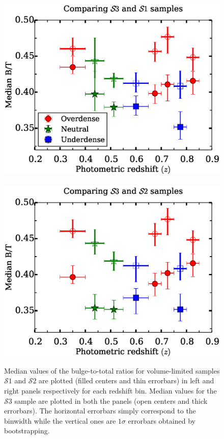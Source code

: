 \documentclass[twocolumn,useAMS,usenatbib]{mn2e}
\newcommand{\s}{\ensuremath{\mathcal{S}}}
\begin{document}
\begin{figure}
  \includegraphics[width=1.0\columnwidth]{median_dvcbtt} \
 \includegraphics[width=1.0\columnwidth]{median_dvcbtt2}
  \caption{ Median values of the bulge-to-total ratios for volume-limited samples \s$1$ and \s$2$ are plotted (filled centers and thin errorbars) in left and right panels respectively for each redshift bin.
          Median values for the \s$3$ sample are plotted in both the panels (open centers and thick errorbars).
          The horizontal errorbars simply correspond to the binwidth while the vertical ones are $1\sigma$ errorbars obtained by bootstrapping.}
 \label{fig:median_dvcbtt}
\end{figure}
\end{document}
